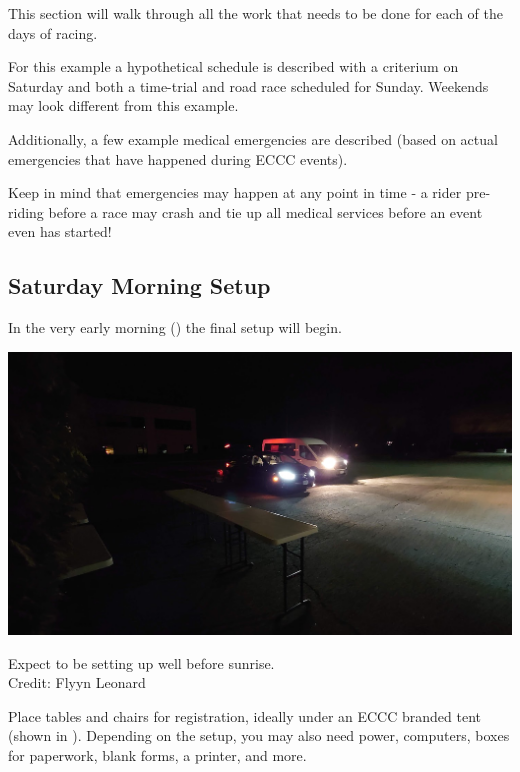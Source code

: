 \documentclass[
  letterpaper, %
  fontsize=10pt, %
  twoside=true,
  chapterentrydots=true, %
  numbers=noenddot,
  fontmethod=tex,
]{kaobook}
\begin{document}
This section will walk through all the work that needs to be done for each of the days of racing.

For this example a hypothetical schedule is described with a criterium on Saturday and both a time-trial and road race scheduled for Sunday.
Weekends may look different from this example.

Additionally, a few example medical emergencies are described
(based on actual emergencies that have happened during ECCC events).

Keep in mind that emergencies may happen at any point in time -
a rider pre-riding before a race may crash and tie up all medical services before an event even has started!


\subsection{Saturday Morning Setup}

In the very early morning ()
the final setup will begin.

\begin{marginfigure}[-10pt]
\includegraphics{2022_umass_early_am.jpg}
\caption[Early morning race setup]{Expect to be setting up well before sunrise.\\
          Credit: Flyyn Leonard}
\end{marginfigure}

Place tables and chairs for registration,
ideally under an ECCC branded tent (shown in ). %
Depending on the setup, you may also need power,
computers, boxes for paperwork, blank forms, a printer, and more.
\end{document}
